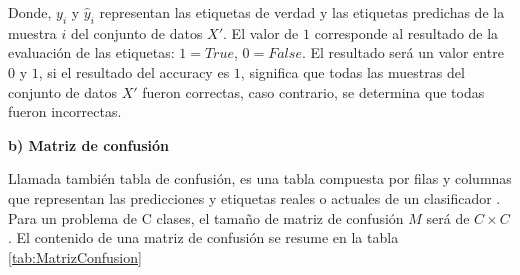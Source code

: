 Donde, $ y_{i} $ y $ \hat{y}_{i} $ representan las etiquetas de verdad y las etiquetas predichas de la muestra $i$ del conjunto de datos $ {X}' $. El valor de $1$ corresponde al resultado de la evaluación de las etiquetas: $ 1 = True $, $ 0 = False $. El resultado será un valor entre $ 0 $ y $ 1 $, si el resultado del accuracy es $ 1 $, significa que todas las muestras del conjunto de datos $ {X}' $ fueron correctas, caso contrario, se determina que todas fueron incorrectas.

\textbf{b) Matriz de confusión}

Llamada también tabla de confusión, es una tabla compuesta por filas y columnas que representan las predicciones y etiquetas reales o actuales de un clasificador \cite{patterson2017deep}. Para un problema de C clases, el tamaño de matriz de confusión $M$ será de $C \times C$. El contenido de una matriz de confusión se resume en la tabla \ref{tab:MatrizConfusion}

